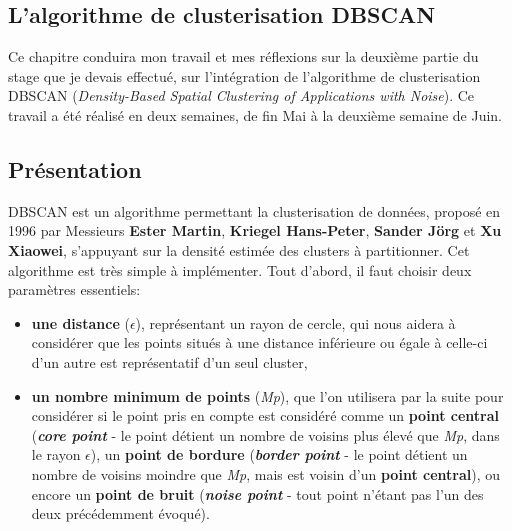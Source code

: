 \documentclass[pdftex,12pt,a4paper]{report}
\begin{document}
\begin{spacing}{1.2}
\chapter{L'algorithme de clusterisation DBSCAN}

Ce chapitre conduira mon travail et mes réflexions sur la deuxième partie du stage que je devais effectué, sur l'intégration de l'algorithme de clusterisation DBSCAN (\textit{Density-Based Spatial Clustering of Applications with Noise}).
\newline
Ce travail a été réalisé en deux semaines, de fin Mai à la deuxième semaine de Juin.

\section{Présentation}

DBSCAN est un algorithme permettant la clusterisation de données, proposé en 1996 par Messieurs \textbf{Ester Martin}, \textbf{Kriegel Hans-Peter}, \textbf{Sander Jörg} et \textbf{Xu Xiaowei}, s'appuyant sur la densité estimée des clusters à partitionner.
Cet algorithme est très simple à implémenter.
Tout d'abord, il faut choisir deux paramètres essentiels:
\begin{itemize}
\item{\textbf{une distance} ($\epsilon$), représentant un rayon de cercle, qui nous aidera à considérer que les points situés à une distance inférieure ou égale à celle-ci d'un autre est représentatif d'un seul cluster},
\item{\textbf{un nombre minimum de points} (\textit{Mp}), que l'on utilisera par la suite pour considérer si le point pris en compte est considéré comme un \textbf{point central} (\textit{\textbf{core point}} - le point détient un nombre de voisins plus élevé que \textit{Mp}, dans le rayon $\epsilon$), un \textbf{point de bordure} (\textit{\textbf{border point}} - le point détient un nombre de voisins moindre que \textit{Mp}, mais est voisin d'un \textbf{point central}), ou encore un \textbf{point de bruit} (\textit{\textbf{noise point}} - tout point n'étant pas l'un des deux précédemment évoqué).}
\end{itemize}


\end{spacing}
\end{document}
